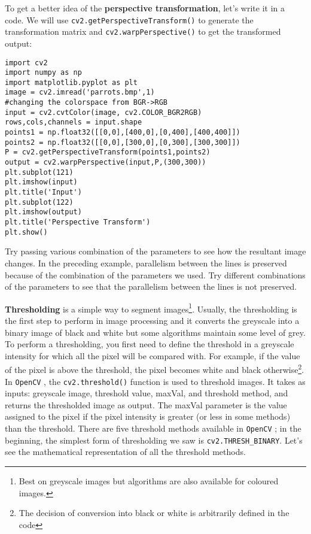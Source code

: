 \documentclass{labo}
\newcommand{\opencv}{\texttt{OpenCV} }
\begin{document}
To get a better idea of the \textbf{perspective transformation}, let’s write it in a code. We will use \texttt{cv2.getPerspectiveTransform()} to generate the transformation matrix and \texttt{cv2.warpPerspective()} to get the transformed output:

\begin{verbatim}
import cv2 
import numpy as np 
import matplotlib.pyplot as plt 
image = cv2.imread('parrots.bmp',1) 
#changing the colorspace from BGR->RGB 
input = cv2.cvtColor(image, cv2.COLOR_BGR2RGB) 
rows,cols,channels = input.shape 
points1 = np.float32([[0,0],[400,0],[0,400],[400,400]]) 
points2 = np.float32([[0,0],[300,0],[0,300],[300,300]]) 
P = cv2.getPerspectiveTransform(points1,points2) 
output = cv2.warpPerspective(input,P,(300,300)) 
plt.subplot(121)
plt.imshow(input)
plt.title('Input') 
plt.subplot(122)
plt.imshow(output)
plt.title('Perspective Transform') 
plt.show()
\end{verbatim}

\begin{leftbar}
Try passing various combination of the parameters to see how the resultant image changes. In the preceding example, parallelism between the lines is preserved because of the combination of the parameters we used. Try different combinations of the parameters to see that the parallelism between the lines is not preserved.
\end{leftbar}

\textbf{Thresholding} is a simple way to segment images\footnote{Best on greyscale images but algorithms are also available for coloured images.}. Usually, the thresholding is the first step to perform in image processing and it converts the greyscale into a binary image of black and white but some algorithms maintain some level of grey. \\

To perform a thresholding, you first need to define the threshold in a greyscale intensity for which all the pixel will be compared with. For example, if the value of the pixel is above the threshold, the pixel becomes white and black otherwise\footnote{The decision of conversion into black or white is arbitrarily defined in the code}. \\

In \opencv, the \texttt{cv2.threshold()} function is used to threshold images. It takes as inputs: greyscale image, threshold value, maxVal, and threshold method, and returns the thresholded image as output. The maxVal parameter is the value assigned to the pixel if the pixel intensity is greater (or less in some methods) than the threshold. There are five threshold methods available in \opencv; in the beginning, the simplest form of thresholding we saw is \texttt{cv2.THRESH\_BINARY}. Let's see the mathematical representation of all the threshold methods.\\
\end{document}
